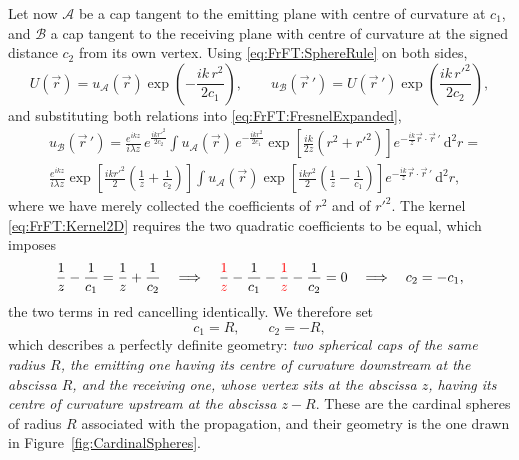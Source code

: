 			Let now $\mathcal{A}$ be a cap tangent to the emitting plane with centre of curvature at $c_{1}$, and $\mathcal{B}$ a cap tangent to the receiving plane with centre of curvature at the signed distance $c_{2}$ from its own vertex. Using \eqref{eq:FrFT:SphereRule} on both sides,
			\begin{equation}\label{eq:FrFT:Referring}
				U(\vec{r}) = u_{\mathcal{A}}(\vec{r})\exp\left(-\frac{ik\,r^{2}}{2c_{1}}\right), \qquad u_{\mathcal{B}}(\vec{r}\,') = U(\vec{r}\,')\exp\left(\frac{ik\,r'^{2}}{2c_{2}}\right),
			\end{equation}
			and substituting both relations into \eqref{eq:FrFT:FresnelExpanded},
			\begin{align*}
				& u_{\mathcal{B}}(\vec{r}\,') = \frac{e^{ikz}}{i\lambda z}\,e^{\frac{ikr'^{2}}{2c_{2}}}\int u_{\mathcal{A}}(\vec{r})\,e^{-\frac{ikr^{2}}{2c_{1}}}\exp\left[\frac{ik}{2z}\left(r^{2}+r'^{2}\right)\right]e^{-\frac{ik}{z}\vec{r}\cdot\vec{r}\,'}\,\mathrm{d}^{2}r = \\
				& \frac{e^{ikz}}{i\lambda z}\exp\left[\frac{ikr'^{2}}{2}\left(\frac{1}{z}+\frac{1}{c_{2}}\right)\right]\int u_{\mathcal{A}}(\vec{r})\exp\left[\frac{ikr^{2}}{2}\left(\frac{1}{z}-\frac{1}{c_{1}}\right)\right]e^{-\frac{ik}{z}\vec{r}\cdot\vec{r}\,'}\,\mathrm{d}^{2}r,
			\end{align*}
			where we have merely collected the coefficients of $r^{2}$ and of $r'^{2}$. The kernel \eqref{eq:FrFT:Kernel2D} requires the two quadratic coefficients to be equal, which imposes
			\begin{equation}\label{eq:FrFT:CardinalCondition}
				\frac{1}{z}-\frac{1}{c_{1}} = \frac{1}{z}+\frac{1}{c_{2}} \quad\Longrightarrow\quad \frac{{\color{red}1}}{{\color{red}z}}-\frac{1}{c_{1}}-\frac{{\color{red}1}}{{\color{red}z}}-\frac{1}{c_{2}}=0 \quad\Longrightarrow\quad c_{2} = -c_{1},
			\end{equation}
			the two terms in red cancelling identically. We therefore set
			\begin{equation}\label{eq:FrFT:Cardinals}
				c_{1} = R, \qquad c_{2} = -R,
			\end{equation}
			which describes a perfectly definite geometry: \textit{two spherical caps of the same radius $R$, the emitting one having its centre of curvature downstream at the abscissa $R$, and the receiving one, whose vertex sits at the abscissa $z$, having its centre of curvature upstream at the abscissa $z-R$}. These are the cardinal spheres of radius $R$ associated with the propagation, and their geometry is the one drawn in Figure~\ref{fig:CardinalSpheres}.

